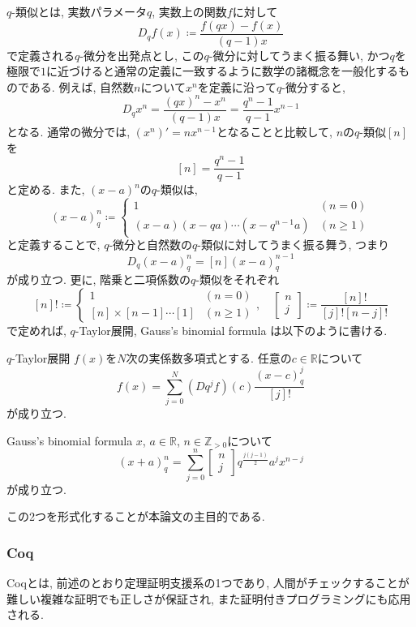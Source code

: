\documentclass[11pt]{jsarticle}
\theoremstyle{mystyle}
\newcommand{\Z}{\mathbb{Z}}
\newcommand{\R}{\mathbb{R}}
\newcommand{\qcoe}[2]{\left[\begin{array}{ccc}#1\\#2\end{array}\right]}
\newcommand{\0}{\textbf{0}}
\begin{document}
$q$-類似とは, 実数パラメータ$q$, 実数上の関数$f$に対して
\[
  D_q f(x) \coloneqq \frac{f(qx) - f(x)}{(q - 1) x}
\]
で定義される$q$-微分を出発点とし, この$q$-微分に対してうまく振る舞い, かつ$q$を極限で$1$に近づけると通常の定義に一致するように数学の諸概念を一般化するものである.
例えば, 自然数$n$について$x^n$を定義に沿って$q$-微分すると, 
\[
  D_q x^n = \frac{(qx)^n - x^n}{(q - 1) x} = \frac{q^n - 1}{q - 1} x^{n - 1}
\]
となる. 通常の微分では, $(x^n)' = n x^{n - 1}$となることと比較して, $n$の$q$-類似$[n]$を
\[
  [n] = \frac{q^n - 1}{q - 1}
\]
と定める. また, $(x - a)^n$の$q$-類似は, 
\[
  (x - a)^n_q \coloneqq \begin{cases}
                                  1 & (n = 0) \\
                                  (x - a) (x - qa) \cdots (x - q^{n - 1} a) & (n \ge 1)
                                \end{cases}
\]
と定義することで, $q$-微分と自然数の$q$-類似に対してうまく振る舞う, つまり
\[
  D_q (x - a)^n_q = [n](x - a)^{n - 1}_q
\]
が成り立つ. 更に, 階乗と二項係数の$q$-類似をそれぞれ
\[
  [n]! \coloneqq \begin{cases}
                        1 & (n = 0)\\
                        [n] \times [n   - 1] \cdots [1] & (n \ge 1)
                      \end{cases}, \quad 
  \qcoe{n}{j} \coloneqq \frac{[n]!}{[j]![n - j]!}
\]
で定めれば, $q$-Taylor展開, Gauss's binomial formula は以下のように書ける. 
\begin{itembox}{$q$-Taylor展開}
  $f(x)$を$N$次の実係数多項式とする. 任意の$c \in \R$について
  \[
    f(x) = \sum_{j = 0}^N (Dq^j f) (c) \frac{(x - c)^j_q}{[j]!}
  \]
  が成り立つ. 
\end{itembox}
\begin{itembox}{Gauss's binomial formula}
  $x$, $a \in \R$, $n \in \Z_{>0}$について
  \[
    (x+a)^n_q = \sum_{j=0}^n \qcoe{n}{j} q^{\frac{j(j-1)}{2}} a^j x^{n-j}
  \]
  が成り立つ. 
\end{itembox}
この2つを形式化することが本論文の主目的である. 
\subsubsection*{Coq}
Coqとは, 前述のとおり定理証明支援系の1つであり, 人間がチェックすることが難しい複雑な証明でも正しさが保証され, また証明付きプログラミングにも応用される. 
\end{document}
